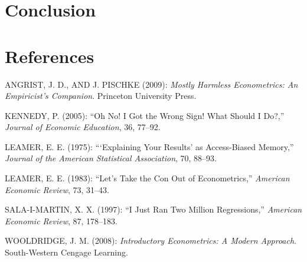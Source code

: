 \documentclass[12pt, a4paper]{article}
\begin{document}
\section{\label{sec_conc}Conclusion}




\newpage

%
%

\section*{\label{sec_ref}References}
ANGRIST, J. D., AND J. PISCHKE (2009): \textit{Mostly Harmless Econometrics: An Empiricist's Companion}. Princeton University Press.
    
\noindent KENNEDY, P. (2005): ``Oh No! I Got the Wrong Sign! What Should I Do?,'' \textit{Journal of Economic Education}, 36, 77--92.
    
\noindent LEAMER, E. E. (1975): ```Explaining Your Results' as Access-Biased Memory,'' \textit{Journal of the American Statistical Association}, 70, 88--93.
    
\noindent LEAMER, E. E. (1983): ``Let's Take the Con Out of Econometrics,'' \textit{American Economic Review}, 73, 31--43.
    
\noindent SALA-I-MARTIN, X. X. (1997): ``I Just Ran Two Million Regressions,'' \textit{American Economic Review}, 87, 178--183.

\noindent WOOLDRIDGE, J. M. (2008): \textit{Introductory Econometrics: A Modern Approach}. South-Western Cengage Learning.

\end{document}
